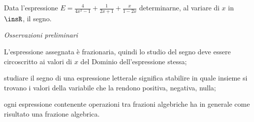 \begin{exrig}
\begin{esempio}
Data l'espressione $E=\frac 4{4x^2-1}+\frac 1{2x+1}+\frac x{1-2x}$ determinarne, 
al variare di $x$ in $\insR$, il segno.

\emph{Osservazioni preliminari}
\begin{itemize*}
\item L'espressione assegnata è frazionaria, quindi lo studio del segno deve 
essere circoscritto ai valori di $x$ del Dominio dell'espressione stessa;
\item studiare il segno di una espressione letterale significa stabilire in 
quale insieme si trovano i valori della variabile che la rendono positiva, 
negativa, nulla;
\item ogni espressione contenente operazioni tra frazioni algebriche ha in 
generale come risultato una frazione algebrica.
\end{itemize*}


\end{esempio}
\end{exrig}
